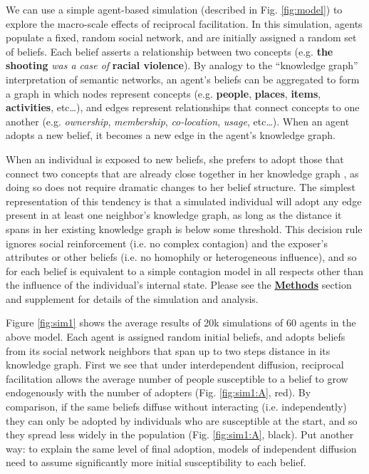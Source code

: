\documentclass[9pt,twocolumn,twoside,lineno]{pnas-new}
\begin{document}
We can use a simple agent-based simulation (described in Fig. \ref{fig:model}) to explore the macro-scale effects of reciprocal facilitation. In this simulation, agents populate a fixed, random social network, and are initially assigned a random set of beliefs. Each belief asserts a relationship between two concepts (e.g. \textbf{the shooting} \textit{was a case of} \textbf{racial violence}). By analogy to the ``knowledge graph'' interpretation of semantic networks\cite{sowa1987semantic, collins1975spreading, popping2003knowledge}, an agent's beliefs can be aggregated to form a graph in which nodes represent concepts (e.g. \textbf{people}, \textbf{places}, \textbf{items}, \textbf{activities}, etc\ldots), and edges represent relationships that connect concepts to one another (e.g. \textit{ownership}, \textit{membership}, \textit{co-location}, \textit{usage}, etc\ldots). When an agent adopts a new belief, it becomes a new edge in the agent's knowledge graph.

When an individual is exposed to new beliefs, she prefers to adopt those that connect two concepts that are already close together in her knowledge graph \cite{schilling2005small,nickerson1998confirmation}, as doing so does not require dramatic changes to her belief structure. The simplest representation of this tendency is that a simulated individual will adopt any edge present in at least one neighbor's knowledge graph, as long as the distance it spans in her existing knowledge graph is below some threshold. This decision rule ignores social reinforcement (i.e. no complex contagion) and the exposer's attributes or other beliefs (i.e. no homophily or heterogeneous influence), and so for each belief is equivalent to a simple contagion model in all respects other than the influence of the individual's internal state. Please see the \hyperref[methods]{\textbf{Methods}} section and supplement for details of the simulation and analysis.

Figure \ref{fig:sim1} shows the average results of 20k simulations of 60 agents in the above model. Each agent is assigned random initial beliefs, and adopts beliefs from its social network neighbors that span up to two steps distance in its knowledge graph. First we see that under interdependent diffusion, reciprocal facilitation allows the average number of people susceptible to a belief to grow endogenously with the number of adopters (Fig. \ref{fig:sim1:A}, red). By comparison, if the same beliefs diffuse without interacting (i.e. independently) they can only be adopted by individuals who are susceptible at the start, and so they spread less widely in the population (Fig. \ref{fig:sim1:A}, black). Put another way: to explain the same level of final adoption, models of independent diffusion need to assume significantly more initial susceptibility to each belief. 
\end{document}
